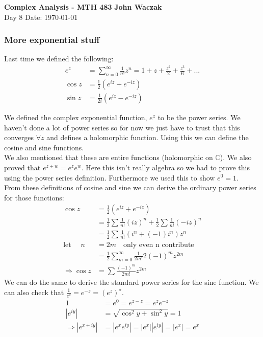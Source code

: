 \documentclass[a4paper, 11pt]{article}
\begin{document}
\noindent
\large\textbf{Complex Analysis - MTH 483} \hfill \textbf{John Waczak} \\
\normalsize Day 8 \hfill  Date: \today \\

\subsubsection*{More exponential stuff}
Last time we defined the following: 
	\begin{align*}
		e^z &= \sum\limits_{n=0}^\infty\frac{1}{n!}z^n = 1 + z + \frac{z^2}{2}+\frac{z^3}{6}+... \\ 
		\cos z &= \frac{1}{2}(e^{iz}+e^{-iz}) \\ 
		\sin z &= \frac{1}{2i}(e^{iz}-e^{-iz}) 
	\end{align*}

\noindent We defined the complex exponential function, $e^z$ to be the power series. We haven't done a lot of power series so for now we just have to trust that this converges $\forall z$ and defines a holomorphic function. Using this we can define the cosine and sine functions. \\ 

\noindent We also mentioned that these are entire functions (holomorphic on $\mathbb{C}$). We also proved that $e^{z+w}=e^ze^w$. Here this isn't really algebra so we had to prove this using the power series definition. Furthermore we used this to show $e^0 = 1$. \\ 

\noindent From these definitions of cosine and sine we can derive the ordinary power series for those functions: 
	\begin{align*}
		\cos z &= \frac{1}{2}(e^{iz}+e^{-iz}) \\ 
			&= \frac{1}{2} \sum \frac{1}{n!}(iz)^n + \frac{1}{2}\sum \frac{1}{n!}(-iz)^n \\ 
			&= \frac{1}{2}\sum\frac{1}{n!}(i^n+(-1)i^n)z^n \\ 
		\text{let } \quad n &= 2m \quad \text{only even n contribute}  \\ 
			&= \frac{1}{2}\sum\limits_{m=0}^\infty \frac{1}{2m!}2(-1)^mz^{2m} \\ 
		\Rightarrow \cos z	&= \sum \frac{(-1)^{m}}{2m!}z^{2m} 
	\end{align*}
\noindent We can do the same to derive the standard power series for the sine function. We can also check that $\frac{1}{e^z}=e^{-z} = (e^z)^\star$. 
	\begin{align*}
		1 &= e^0 = e^{z-z} = e^{z}e^{-z} \\ 
		|e^{iy}| &= \sqrt{\cos^2y+\sin^2y} = 1 \\
		\Rightarrow |e^{x+iy}| &= |e^xe^{iy}| = |e^{x}||e^{iy}| = |e^x| = e^x
	\end{align*}
	
\end{document}
